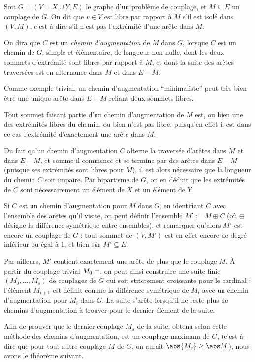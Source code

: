  \SEP\jdefi Soit $G = (V = X \cup Y, E)$ le graphe d'un problème de couplage, et $M \subseteq E$ un couplage de $G$. On dit que $v \in V$ est libre par rapport à $M$ s'il est isolé dans $(V,M)$, c'est-à-dire s'il n'est pas l'extrémité d'une arête dans $M$.
 
 On dira que $C$ est un \emph{chemin d'augmentation} de $M$ dans $G$, lorsque $C$ est un chemin de $G$, simple et élémentaire, de longueur non nulle, dont les deux sommets d'extrémité sont libres par rapport à $M$, et dont la suite des arêtes traversées est en alternance dans $M$ et dans $E \minus M$.
 \SEP
 
 Comme exemple trivial, un chemin d'augmentation ``minimaliste'' peut très bien être une unique arête dans $E\minus M$ reliant deux sommets libres.
 
 Tout sommet faisant partie d'un chemin d'augmentation de $M$ est, ou bien une des extrémités libres du chemin, ou bien n'est pas libre, puisqu'en effet il est dans ce cas l'extrémité d'exactement une arête dans $M$.
 
 Du fait qu'un chemin d'augmentation $C$ alterne la traversée d'arêtes dans $M$ et dans $E\minus M$, et comme il commence et se termine par des arêtes dans $E\minus M$ (puisque ses extrémités sont libres pour $M$), il est alors nécessaire que la longueur du chemin $C$ soit impaire. Par bipartisme de $G$, on en déduit que les extrémités de $C$ sont nécessairement un élément de $X$ et un élément de $Y$.
 
 Si $C$ est un chemin d'augmentation pour $M$ dans $G$, en identifiant $C$ avec l'ensemble des arêtes qu'il visite, on peut définir l'ensemble $M' := M \oplus C$ (où $\oplus$ désigne la différence symétrique entre ensembles), et remarquer qu'alors $M'$ est encore un couplage de $G$ : tout sommet de $(V, M')$ est en effet encore de degré inférieur ou égal à 1, et bien sûr $M' \subseteq E$.
 
 Par ailleurs, $M'$ contient exactement une arête de plus que le couplage $M$. À partir du couplage trivial $M_0 = \empty$, on peut ainsi construire une suite finie $(M_0,\dots,M_s)$ de couplages de $G$ qui soit strictement croissante pour le cardinal : l'élément $M_{i+1}$ est définit comme la différence symétrique de $M_i$ avec un chemin d'augmentation pour $M_i$ dans $G$. La suite s'arête lorsqu'il ne reste plus de chemins d'augmentation à trouver pour le dernier élément de la suite.
 
 Afin de prouver que le dernier couplage $M_s$ de la suite, obtenu selon cette méthode des chemins d'augmentation, est un couplage maximum de $G$, (c'est-à-dire que pour tout autre couplage $M$ de $G$, on aurait $\abs{M_s} \geq \abs M$), nous avons le théorème suivant.
 
